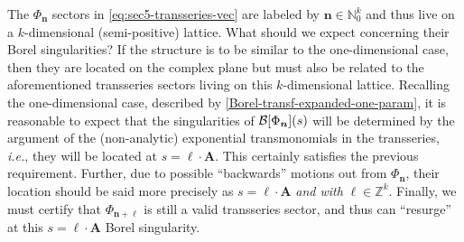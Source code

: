 \documentclass[11pt,a4paper]{article}
\newcommand{\CB}{{\cal B}}
\def\BN{{\mathbb N}}
\def\BZ{{\mathbb Z}}
\begin{document}
The $\Phi_{\boldsymbol{n}}$ sectors in \eqref{eq:sec5-transseries-vec} are labeled by $\boldsymbol{n} \in \BN_0^k$ and thus live on a $k$-dimensional (semi-positive) lattice. What should we expect concerning their Borel singularities? If the structure is to be similar to the one-dimensional case, then they are located on the complex plane but must also be related to the aforementioned transseries sectors living on this $k$-dimensional lattice. Recalling the one-dimensional case, described by \eqref{Borel-transf-expanded-one-param}, it is reasonable to expect that the singularities of $\CB [\Phi_{\boldsymbol{n}}] (s)$ will be determined by the argument of the (non-analytic) exponential transmonomials in the transseries, \textit{i.e.}, they will be located at $s = \boldsymbol{\ell} \cdot \boldsymbol{A}$. This certainly satisfies the previous requirement. Further, due to possible ``backwards'' motions out from $\Phi_{\boldsymbol{n}}$, their location should be said more precisely as $s = \boldsymbol{\ell} \cdot \boldsymbol{A}$ \textit{and with} $\boldsymbol{\ell} \in \BZ^k$. Finally, we must certify that $\Phi_{\boldsymbol{n}+\boldsymbol{\ell}}$ is still a valid transseries sector, and thus can ``resurge'' at this $s = \boldsymbol{\ell} \cdot \boldsymbol{A}$ Borel singularity.
\end{document}
